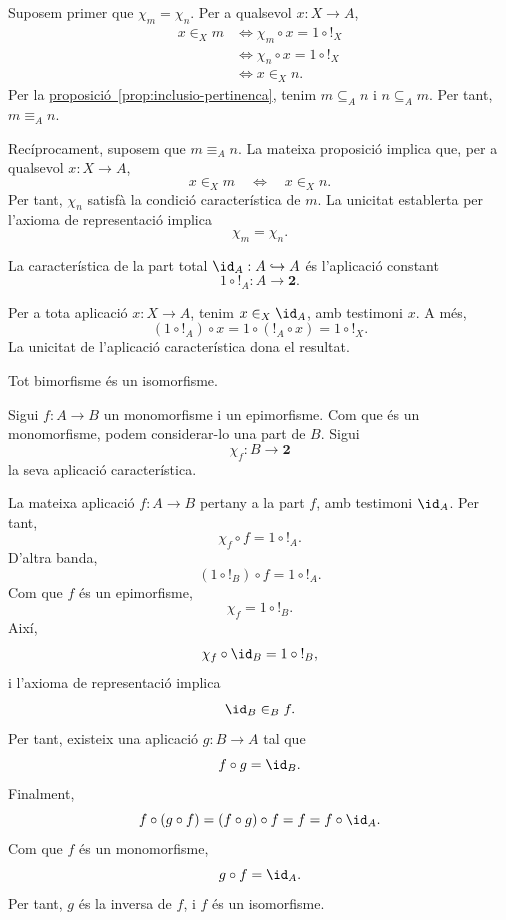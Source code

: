 \begin{prova}
Suposem primer que \(\chi_m=\chi_n\). Per a qualsevol \(x:X\to A\),
\[
\begin{aligned}
x\in_X m
&\Longleftrightarrow \chi_m\circ x=1\circ {!}_X\\
&\Longleftrightarrow \chi_n\circ x=1\circ {!}_X\\
&\Longleftrightarrow x\in_X n.
\end{aligned}
\]
Per la \hyperref[prop:inclusio-pertinenca]{proposició~\ref*{prop:inclusio-pertinenca}}, tenim \(m\subseteq_A n\) i \(n\subseteq_A m\). Per tant, \(m\equiv_A n\).

Recíprocament, suposem que \(m\equiv_A n\). La mateixa proposició implica que, per a qualsevol \(x:X\to A\),
\[
x\in_Xm\quad\Longleftrightarrow\quad x\in_Xn.
\]
Per tant, \(\chi_n\) satisfà la condició característica de \(m\). La unicitat establerta per l'axioma de representació implica
\[
\chi_m=\chi_n.
\]
\end{prova}

\begin{proposicio}\label{prop:caracteristica-total}
La característica de la part total \(\id_A:A\hookrightarrow A\) és l'aplicació constant
\[
1\circ {!}_A:A\to\mathbf2.
\]
\end{proposicio}

\begin{prova}
Per a tota aplicació \(x:X\to A\), tenim \(x\in_X\id_A\), amb testimoni \(x\). A més,
\[
(1\circ {!}_A)\circ x
=1\circ({!}_A\circ x)
=1\circ {!}_X.
\]
La unicitat de l'aplicació característica dona el resultat.
\end{prova}

\begin{proposicio}\label{prop:bimorfisme-isomorfisme}
Tot bimorfisme és un isomorfisme.
\end{proposicio}

\begin{prova}
Sigui \(f:A\to B\) un monomorfisme i un epimorfisme. Com que és un monomorfisme, podem considerar-lo una part de \(B\). Sigui
\[
\chi_f:B\to\mathbf2
\]
la seva aplicació característica.

La mateixa aplicació \(f:A\to B\) pertany a la part \(f\), amb testimoni \(\id_A\). Per tant,
\[
\chi_f\circ f=1\circ {!}_A.
\]
D'altra banda,
\[
(1\circ {!}_B)\circ f=1\circ {!}_A.
\]
Com que \(f\) és un epimorfisme,
\[
\chi_f=1\circ {!}_B.
\]
Així,
\[
\chi_f\circ\id_B=1\circ {!}_B,
\]
i l'axioma de representació implica
\[
\id_B\in_B f.
\]
Per tant, existeix una aplicació \(g:B\to A\) tal que
\[
f\circ g=\id_B.
\]
Finalment,
\[
f\circ(g\circ f)=(f\circ g)\circ f=f=f\circ\id_A.
\]
Com que \(f\) és un monomorfisme,
\[
g\circ f=\id_A.
\]
Per tant, \(g\) és la inversa de \(f\), i \(f\) és un isomorfisme.
\end{prova}

